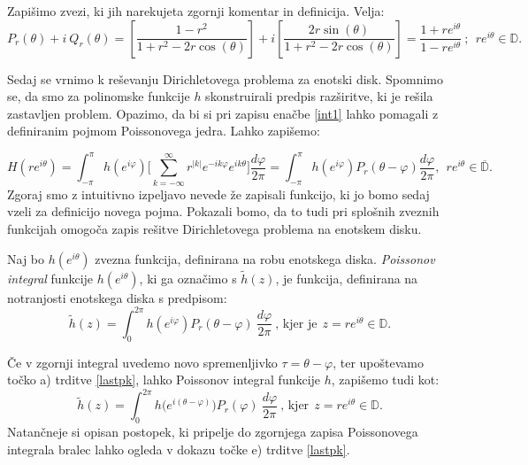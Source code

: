 \documentclass[mat1]{fmfdelo}
\begin{document}
    \begin{opomba}
        Zapišimo zvezi, ki jih narekujeta zgornji komentar in definicija. Velja:
        $$
        P_r(\theta) + i~Q_r(\theta) = \left[ \frac{1-r^2}{1+ r^2 - 2r \cos(\theta)}\right] + i \left[\frac{2 r \sin(\theta)}{1+ r^2 - 2r \cos(\theta)}\right] = \frac{1 + re^{i\theta}}{1 - re^{i\theta}}~;~~r e^{i\theta} \in \mathbb{D}.
        $$
    \end{opomba}

    Sedaj se vrnimo k reševanju Dirichletovega problema za enotski disk. 
    Spomnimo se, da smo za polinomske funkcije $h$ skonstruirali predpis razširitve, ki je rešila zastavljen problem. 
    Opazimo, da bi si pri zapisu enačbe \eqref{int1} lahko pomagali z definiranim pojmom Poissonovega jedra. Lahko zapišemo:
    
    $$
    H(r e^{i \theta}) = \int_{-\pi}^{\pi}{h(e^{i \varphi}) \bigg[\sum_{k = - \infty}^{\infty} r^{|k|} e^{- i k \varphi} e^{i k \theta}} \bigg]\frac{d \varphi}{2 \pi} = 
    \int_{-\pi}^{\pi}{h(e^{i \varphi}) P_r(\theta - \varphi)\frac{d \varphi}{2 \pi}},~~r e^{i \theta} \in \overline{\mathbb{D}}.
    $$
    Zgoraj smo z intuitivno izpeljavo nevede že zapisali funkcijo, ki jo bomo sedaj vzeli za definicijo novega pojma. 
    Pokazali bomo, da to tudi pri splošnih zveznih funkcijah omogoča zapis rešitve Dirichletovega problema na enotskem disku.

    \begin{definicija}
        Naj bo $h(e^{i \theta})$ zvezna funkcija, definirana na robu enotskega diska.
        \emph{Poissonov integral} funkcije $h(e^{i\theta})$, ki ga označimo s $\widetilde{h}(z)$, je funkcija, definirana na notranjosti enotskega diska s predpisom:
        $$
        \widetilde{h}(z) = \int_{0}^{2\pi}{h(e^{i\varphi}) P_r(\theta - \varphi)~\frac{d\varphi}{2 \pi}}~\text{, kjer je}~~z = r e^{i\theta} \in \mathbb{D}.
        $$
     \end{definicija}
     \begin{opomba}
        \label{kom_poiss}
        Če v zgornji integral uvedemo novo spremenljivko $\tau = \theta - \varphi$, ter upoštevamo točko a) trditve \ref{lastpk}, lahko Poissonov integral funkcije $h$, zapišemo tudi kot:
        $$
        \widetilde{h}(z) = \int_{0}^{2\pi}{h\big(e^{i(\theta-\varphi)}\big) P_r(\varphi)~\frac{d\varphi}{2 \pi}}~\text{, kjer}~~z = r e^{i\theta} \in \mathbb{D}.
        $$
        Natančneje si opisan postopek, ki pripelje do zgornjega zapisa Poissonovega integrala bralec lahko ogleda v dokazu točke e) trditve \ref{lastpk}.
     \end{opomba}
\end{document}

